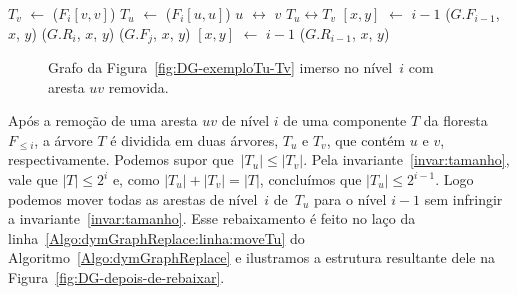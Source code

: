 \begin{algorithm}
\caption{\dymGraphReplace($G$, $u$, $v$, $niv$)}
\label{Algo:dymGraphReplace}
\begin{algorithmic}[1]
\label{Algo:dymGraphReplace:linha:primeira}
\State $T_v$ $\gets$  \treapGetRoot($F_i[v,v]$)
\State $T_u$ $\gets$  \treapGetRoot($F_i[u,u]$)
\State $u$ $\leftrightarrow$ $v$
\State $T_u \leftrightarrow T_v$
\EndIf
{}\label{Algo:dymGraphReplace:linha:moveTu}
\State \nivel$[x,y]$ $\gets$ $i-1$ \label{Algo:dymGraphReplace:linha:moveTu2}
\State \dymForestAddEdge($G$.$F_{i-1}$, $x$, $y$) \label{Algo:dymGraphReplace:linha:moveTu3}
\EndFor
{}\label{Algo:dymGraphReplace:linha:achaSub}
\State \graphDel($G$.$R_i$, $x$, $y$)
\label{Algo:dymGraphReplace:linhayinTv}
\label{Algo:dymGraphReplace:linha:inseresub}
\State \dymForestAddEdge($G$.$F_j$, $x$, $y$)
\EndFor
\State \Return
\Else
\State \nivel$[x,y]$ $\gets$ $i-1$ \label{Algo:dymGraphReplace:linha:rebaixar}
\State \graphAdd($G$.$R_{i-1}$, $x$, $y$) \label{Algo:dymGraphReplace:linha:rebaixar2}
\EndIf
\EndFor
\EndFor\label{Algo:dymGraphReplace:linha:ultima}
\end{algorithmic}
\end{algorithm}


\newpage
\begin{figure}[htb]
\centering
\caption{Grafo da Figura~\ref{fig:DG-exemploTu-Tv} imerso no nível~$i$ com aresta $uv$ removida.}
\label{fig:DG-antes-de-rebaixar}
\end{figure}

Após a remoção de uma aresta $uv$ de nível $i$ de uma componente $T$ da floresta $F_{\leqslant i}$, a árvore $T$ é dividida em duas árvores, $T_u$ e $T_v$, que contém $u$ e $v$, respectivamente.
Podemos supor que~$|T_u|\leqslant |T_v|$. Pela invariante~\ref{invar:tamanho}, vale que $|T| \leq 2^i$ e, como ${|T_u| + |T_v| = |T|}$, concluímos que $|T_u| \leq 2^{i-1}$. Logo podemos mover todas as arestas de nível~$i$ de~$T_u$ para o nível $i-1$ sem infringir a invariante~\ref{invar:tamanho}.
Esse rebaixamento é feito no laço da linha~\ref{Algo:dymGraphReplace:linha:moveTu} do Algoritmo~\ref{Algo:dymGraphReplace} e ilustramos a estrutura resultante dele na Figura~\ref{fig:DG-depois-de-rebaixar}.

